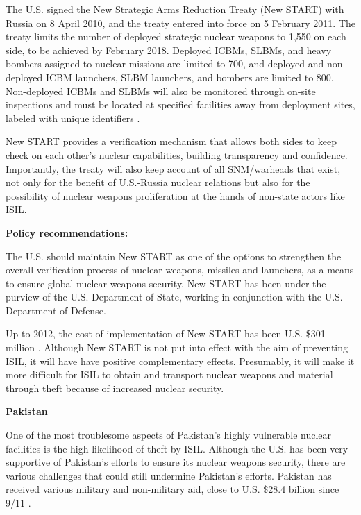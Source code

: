 \documentclass{report}
\begin{document}
The U.S. signed the New Strategic Arms Reduction Treaty (New START) with Russia on 8 April 2010, and the treaty entered into force on 5 February 2011. The treaty limits the number of deployed strategic nuclear weapons to 1,550 on each side, to be achieved by February 2018. Deployed ICBMs, SLBMs, and heavy bombers assigned to nuclear missions are limited to 700, and deployed and non-deployed ICBM launchers, SLBM launchers, and bombers are limited to 800. Non-deployed ICBMs and SLBMs will also be monitored through on-site inspections and must be located at specified facilities away from deployment sites, labeled with unique identifiers \cite{U.S.DepartmentofState2015}. 

New START provides a verification mechanism that allows both sides to keep check on each other's nuclear capabilities, building transparency and confidence. Importantly, the treaty will also keep account of all SNM/warheads that exist, not only for the benefit of U.S.-Russia nuclear relations but also for the possibility of nuclear weapons proliferation at the hands of non-state actors like ISIL.

\textbf{Policy recommendations:}

The U.S. should maintain New START as one of the options to strengthen the overall verification process of nuclear weapons, missiles and launchers, as a means to ensure global nuclear weapons security. New START has been under the purview of the U.S. Department of State, working in conjunction with the U.S. Department of Defense.

Up to 2012,  the cost of implementation of  New START has been U.S. \$301 million \cite{U.S.DepartmentofDefense2012}. Although  New START is not put into effect with the aim of preventing ISIL, it will have have positive complementary effects. Presumably, it will make it more difficult for ISIL to obtain and transport nuclear weapons and material through theft because of increased nuclear security. 



\textbf{Pakistan}

One of the most troublesome aspects of Pakistan's highly vulnerable nuclear  facilities is the high likelihood of theft by ISIL. Although the U.S. has been very supportive of Pakistan's efforts to ensure its nuclear weapons security, there are various challenges that could still undermine Pakistan's efforts. Pakistan has received various military and non-military aid, close to U.S. \$28.4 billion  since 9/11 \cite{Upadhyay2014}. 
\end{document}
